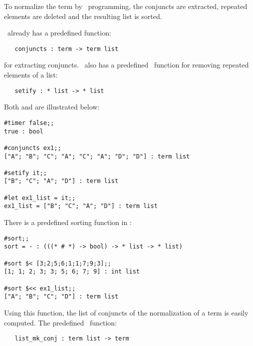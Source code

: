 To normalize the term by \ML\ programming, the conjuncts are extracted,
repeated elements are deleted and the resulting list is sorted.

\HOL\ already has a predefined function:

\begin{hol}\begin{verbatim}
   conjuncts : term -> term list
\end{verbatim}\end{hol}

\noindent for extracting conjuncts.
\HOL\ also has a predefined \ML\ function for removing repeated elements of
a list:


\begin{hol}\begin{verbatim}
   setify : * list -> * list
\end{verbatim}\end{hol}

\noindent Both  and  are illustrated below:

\begin{session}\begin{verbatim}
#timer false;;
true : bool

#conjuncts ex1;;
["A"; "B"; "C"; "A"; "C"; "A"; "D"; "D"] : term list

#setify it;;
["B"; "C"; "A"; "D"] : term list

#let ex1_list = it;;
ex1_list = ["B"; "C"; "A"; "D"] : term list
\end{verbatim}\end{session}

There is a predefined sorting function in \ML:

\begin{session}\begin{verbatim}
#sort;; 
sort = - : (((* # *) -> bool) -> * list -> * list)

#sort $< [3;2;5;6;1;1;7;9;3];;
[1; 1; 2; 3; 3; 5; 6; 7; 9] : int list

#sort $<< ex1_list;;
["A"; "B"; "C"; "D"] : term list
\end{verbatim}\end{session}

Using this function, the list of conjuncts of the normalization of a
term is easily computed.  The predefined \ML\ function:

\begin{hol}\begin{verbatim}
   list_mk_conj : term list -> term
\end{verbatim}\end{hol}

